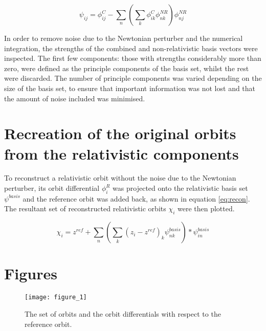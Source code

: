 \documentclass[11pt,a4paper]{article}
\begin{document}

\begin{equation}\label{eq:proj}
\psi_{ij} = \phi^{C}_{ij} - \sum\limits_{n} (\sum\limits_{k} \phi^C_{ik} \phi^{NR}_{nk}) \phi^{NR}_{nj}
\end{equation}

In order to remove noise due to the Newtonian perturber and the numerical integration, the strengths of the combined and non-relativistic basis vectors were inspected. The first few components: those with strengths considerably more than zero, were defined as the principle components of the basis set, whilst the rest were discarded. The number of principle components was varied depending on the size of the basis set, to ensure that important information was not lost and that the amount of noise included was minimised.

\section{Recreation of the original orbits from the relativistic components}

To reconstruct a relativistic orbit without the noise due to the Newtonian perturber, its orbit differential $\phi^R_i$ was projected onto the relativistic basis set $\psi^{basis}$ and the reference orbit was added back, as shown in equation \ref{eq:recon}. The resultant set of reconstructed relativistic orbits $\chi_{i}$ were then plotted.

\begin{equation}\label{eq:recon}
\chi_{i} = z^{ref} + \sum\limits_{n} (\sum\limits_{k} (z_{i} - z^{ref})_{k} \psi^{basis}_{nk})*\psi^{basis}_{in}
\end{equation}

\newpage
\section{Figures}

\begin{figure}[h]
\centerline{\texttt{[image: figure\_1]}}
\caption{The set of orbits and the orbit differentials with respect to the reference orbit. \label{fig:orbs}}
\end{figure}
\end{document}
